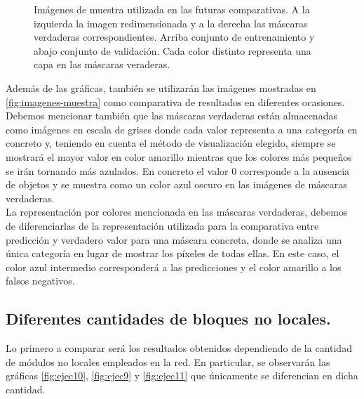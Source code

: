 \begin{figure}[h]
  \caption{Imágenes de muestra utilizada en las futuras comparativas. A la izquierda la imagen redimensionada y a la derecha las máscaras verdaderas correspondientes. Arriba conjunto de entrenamiento y abajo conjunto de validación. Cada color distinto representa una capa en las máscaras veraderas.}
  \label{fig:imagenes-muestra}
\end{figure}

Además de las gráficas, también se utilizarán las imágenes mostradas en \autoref{fig:imagenes-muestra} como comparativa de resultados en diferentes ocasiones. Debemos mencionar también que las máscaras verdaderas están almacenadas como imágenes en escala de grises donde cada valor representa a una categoría en concreto y, teniendo en cuenta el método de visualización elegido, siempre se mostrará el mayor valor en color amarillo mientras que los colores más pequeños se irán tornando más azulados. En concreto el valor $0$ corresponde a la ausencia de objetos y se muestra como un color azul oscuro en las imágenes de máscaras verdaderas.\\

\newpage
La representación por colores mencionada en las máscaras verdaderas, debemos de diferenciarlas de la representación utilizada para la comparativa entre predicción y verdadero valor para una máscara concreta, donde se analiza una única categoría en lugar de mostrar los píxeles de todas ellas. En este caso, el color azul intermedio corresponderá a las predicciones y el color amarillo a los falsos negativos.\\

\newpage
\subsection{Diferentes cantidades de bloques no locales.}
Lo primero a comparar será los resultados obtenidos dependiendo de la cantidad de módulos no locales empleados en la red. En particular, se observarán las gráficas \autoref{fig:ejec10}, \autoref{fig:ejec9} y \autoref{fig:ejec11} que únicamente se diferencian en dicha cantidad.\\

